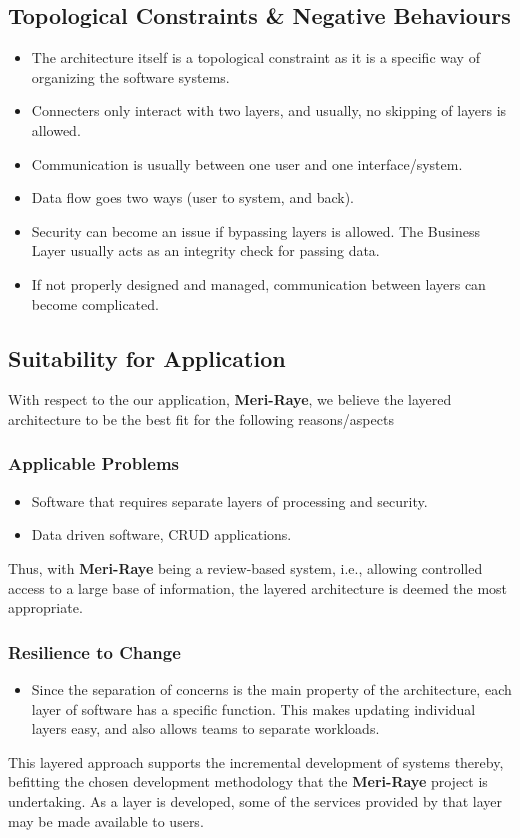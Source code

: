 \documentclass[11pt]{extarticle}
\begin{document}
\subsection{Topological Constraints \& Negative Behaviours}
\begin{itemize}
    \item The architecture itself is a topological constraint as it is a specific way of organizing the
    software systems.
    \item Connecters only interact with two layers, and usually, no skipping of layers is allowed.
    \item Communication is usually between one user and one interface/system.
    \item Data flow goes two ways (user to system, and back).
    \item Security can become an issue if bypassing layers is allowed. The Business Layer usually acts as
    an integrity check for passing data.
    \item If not properly designed and managed, communication between layers can become
    complicated. 
\end{itemize}

\subsection{Suitability for Application}
With respect to the our application, \textbf{Meri-Raye}, we believe the layered architecture to be the best fit for the following reasons/aspects

\subsubsection{Applicable Problems}
\begin{itemize}
    \item Software that requires separate layers of processing and security.
    \item Data driven software, CRUD applications.
\end{itemize}
Thus, with \textbf{Meri-Raye} being a review-based system, i.e., allowing controlled access to a large base of information, the layered architecture is deemed the most appropriate. 

\subsubsection{Resilience to Change}
\begin{itemize}
    \item Since the separation of concerns is the main property of the architecture, each layer of
    software has a specific function. This makes updating individual layers easy, and also allows
    teams to separate workloads.
\end{itemize}
This layered approach supports the incremental development of systems thereby, befitting the chosen development methodology that the \textbf{Meri-Raye} project is undertaking.
As a layer is developed, some of the services provided by that layer may be made available
to users.
\end{document}
